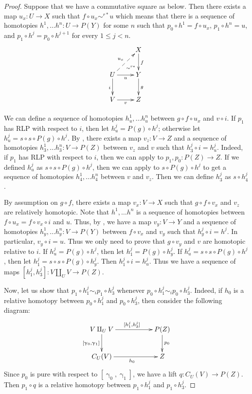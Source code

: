 \documentclass{tac}
\theoremstyle{definition}
\newcommand{\cyli}{\upgamma}
\begin{document}
\begin{proof}
Suppose that we have a commutative square as below.
Then there exists a map $u_x : U \to X$ such that $f \circ u_x \sim^{r*} u$ which means that there is a sequence of homotopies $h^1, \ldots h^n : U \to P(Y)$ for some $n$
such that $p_0 \circ h^1 = f \circ u_x$, $p_1 \circ h^n = u$, and $p_1 \circ h^j = p_0 \circ h^{j+1}$ for every $1 \leq j < n$.
\[ \xymatrix{   \ar@{}[dr]|(.7){\sim^{r*}}            & X \ar[d]^f \\
              U \ar@{-->}[ur]^{u_x} \ar[d]_i \ar[r]_u & Y \ar[d]^g \\
              V \ar[r]_v                              & Z
            } \]

We can define a sequence of homotopies $h^1_u, \ldots h^n_u$ between $g \circ f \circ u_x$ and $v \circ i$.
If $p_1$ has RLP with respect to $i$, then let $h^j_u = P(g) \circ h^j$; otherwise let $h^j_u = s \circ s \circ P(g) \circ h^j$.
By , there exists a map $v_z : V \to Z$ and a sequence of homotopies $h^1_3, \ldots h^n_3 : V \to P(Z)$ between $v_z$ and $v$ such that $h^j_3 \circ i = h^j_u$.
Indeed, if $p_1$ has RLP with respect to $i$, then we can apply  to $p_1,p_0 : P(Z) \to Z$.
If we defined $h^j_u$ as $s \circ s \circ P(g) \circ h^j$, then we can apply  to $s \circ P(g) \circ h^j$ to get a sequence of homotopies $h^1_4, \ldots h^n_4$ between $v$ and $v_z$.
Then we can define $h^j_3$ as $s \circ h^j_4$.

By assumption on $g \circ f$, there exists a map $v_x : V \to X$ such that $g \circ f \circ v_x$ and $v_z$ are relatively homotopic.
Note that $h^1, \ldots h^n$ is a sequence of homotopies between $f \circ u_x = f \circ v_x \circ i$ and $u$.
Thus, by , we have a map $v_y : V \to Y$ and a sequence of homotopies $h^1_y, \ldots h^n_y : V \to P(Y)$ between $f \circ v_x$ and $v_y$ such that $h^j_y \circ i = h^j$.
In particular, $v_y \circ i = u$.
Thus we only need to prove that $g \circ v_y$ and $v$ are homotopic relative to $i$.
If $h^j_u = P(g) \circ h^j$, then let $h^j_1 = P(g) \circ h^j_y$.
If $h^j_u = s \circ s \circ P(g) \circ h^j$, then let $h^j_1 = s \circ s \circ P(g) \circ h^j_y$.
Then $h^j_1 \circ i = h^j_u$.
Thus we have a sequence of maps $[h^j_1,h^j_3] : V \amalg_U V \to P(Z)$.

Now, let us show that $p_1 \circ h^j_1 \sim_i p_1 \circ h^j_3$ whenever $p_0 \circ h^j_1 \sim_i p_0 \circ h^j_3$.
Indeed, if $h_0$ is a relative homotopy between $p_0 \circ h^j_1$ and $p_0 \circ h^j_3$, then consider the following diagram:
\[ \xymatrix{ V \amalg_U V \ar[rr]^{[h^j_1, h^j_3]} \ar[d]_{[\cyli_0,\cyli_1]} & & P(Z) \ar[d]^{p_0} \\
              C_U(V) \ar[rr]_{h_0} & & Z
            } \]
Since $p_0$ is pure with respect to $[\cyli_0,\cyli_1]$, we have a lift $q : C_U(V) \to P(Z)$.
Then $p_1 \circ q$ is a relative homotopy between $p_1 \circ h^j_1$ and $p_1 \circ h^j_3$.


\end{proof}
\end{document}
